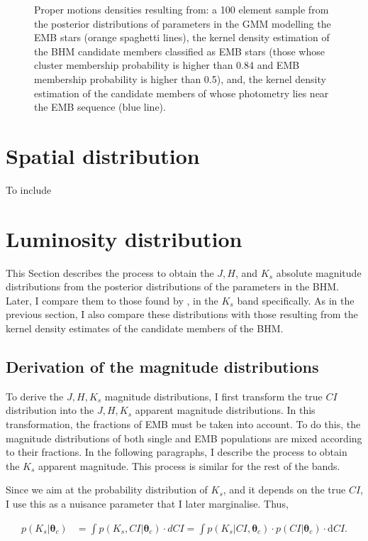 \begin{figure}[ht!]
\begin{subfigure}[t]{0.45\textwidth}
        \caption{}
    \end{subfigure}
\caption{Proper motions densities resulting from: a 100 element sample from the posterior distributions of parameters in the GMM modelling the EMB stars (orange spaghetti lines), the kernel density estimation of the BHM candidate members classified as EMB stars (those whose cluster membership probability is higher than 0.84 and EMB membership probability is higher than 0.5), and, the kernel density estimation of the candidate members of \citet{Bouy2015} whose photometry lies near the EMB sequence (blue line).}
\label{fig:PMBs}
\end{figure}

\section{Spatial distribution}
To include
\section{Luminosity distribution}
\label{sect:luminosity}
This Section describes the process to obtain the $J,H$, and $K_s$ absolute magnitude distributions from the posterior distributions of the parameters in the BHM. Later, I compare them to those found by \citet{Bouy2015}, in the $K_s$ band specifically. As in the previous section, I also compare these distributions with those resulting from the kernel density estimates of the candidate members of the BHM.

\subsection{Derivation of the magnitude distributions}
\label{subsect:deriveluminosity}
To derive the $J,H,K_s$ magnitude distributions, I first transform the true $CI$ distribution into the $J,H,K_s$ apparent magnitude distributions. In this transformation, the fractions of EMB must be taken into account. To do this, the magnitude distributions of both single and EMB populations are mixed according to their fractions. In the following paragraphs, I describe the process to obtain the $K_s$ apparent magnitude. This process is similar for the rest of the bands. 

Since we aim at the probability distribution of $K_s$, and it depends on the true $CI$, I use this as a nuisance parameter that I later marginalise. Thus, 

\begin{align}
p(K_s | \boldsymbol{\theta}_c) & = \int p(K_s,CI | \boldsymbol{\theta}_c) \cdot dCI =  \int p(K_s | CI ,\boldsymbol{\theta}_c) \cdot p(CI|\boldsymbol{\theta}_c)\cdot \mathrm{d}CI. \nonumber
\end{align}

